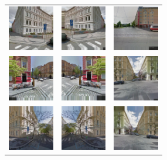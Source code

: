 \documentclass[border={5pt 1pt 5pt 5pt}, varwidth=38em]{standalone}
\begin{document}
\setlength{\tabcolsep}{0.1em}
{
\renewcommand{\arraystretch}{0.5}

\begin{table}[ht]
\centering
\begin{tabular}{ccc}
\includegraphics[width=20mm]{imgs_for_table/ag_expanded/0003_16.jpg} & \includegraphics[width=20mm]{imgs_for_table/ag_expanded/0003_17.jpg} & \includegraphics[width=20mm]{imgs_for_table/ag_expanded/0003_b0014_13.jpg}\\
\newline
\includegraphics[width=20mm]{imgs_for_table/ag_expanded/0004_16.jpg} & \includegraphics[width=20mm]{imgs_for_table/ag_expanded/0004_17.jpg} & \includegraphics[width=20mm]{imgs_for_table/ag_expanded/0004_b0009_13.jpg}\\
\newline
\includegraphics[width=20mm]{imgs_for_table/ag_expanded/0009_8.jpg} & \includegraphics[width=20mm]{imgs_for_table/ag_expanded/0009_9.jpg} & \includegraphics[width=20mm]{imgs_for_table/ag_expanded/0009_12.jpg}\\

\end{tabular}
\end{table}}
\end{document}
